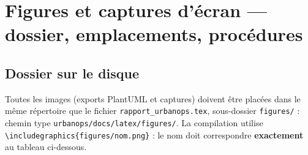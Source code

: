 \documentclass[12pt,a4paper,twoside,openany]{book}
\begin{document}
\appendix
\chapter{Figures et captures d'écran — dossier, emplacements, procédures}
\label{ann:guidefig}

\section*{Dossier sur le disque}
Toutes les images (exports PlantUML et captures) doivent être placées dans le même répertoire que le fichier \texttt{rapport\_urbanops.tex}, sous-dossier \texttt{figures/} : chemin type \texttt{urbanops/docs/latex/figures/}. La compilation utilise \texttt{\textbackslash includegraphics\{figures/nom.png\}} : le nom doit correspondre \textbf{exactement} au tableau ci-dessous.
\end{document}
